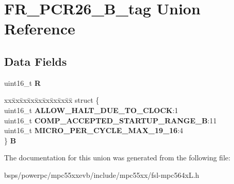 \hypertarget{unionFR__PCR26__16B__tag}{}\section{F\+R\+\_\+\+P\+C\+R26\+\_\+B\+\_\+tag Union Reference}
\label{unionFR__PCR26__16B__tag}
\subsection*{Data Fields}
\begin{DoxyCompactItemize}
\item 
\mbox{\label{unionFR__PCR26__16B__tag_acda383066420ba817193115c36327430}} 
uint16\+\_\+t {\bfseries R}
\item 
\mbox{\label{unionFR__PCR26__16B__tag_a80a3d0468ddcd3802fa44b8a509f3fe8}} 
\begin{tabbing}
xx\=xx\=xx\=xx\=xx\=xx\=xx\=xx\=xx\=\kill
struct \{\\
\>uint16\_t {\bfseries ALLOW\_HALT\_DUE\_TO\_CLOCK}:1\\
\>uint16\_t {\bfseries COMP\_ACCEPTED\_STARTUP\_RANGE\_B}:11\\
\>uint16\_t {\bfseries MICRO\_PER\_CYCLE\_MAX\_19\_16}:4\\
\} {\bfseries B}\\

\end{tabbing}\end{DoxyCompactItemize}


The documentation for this union was generated from the following file\+:\begin{DoxyCompactItemize}
\item 
bsps/powerpc/mpc55xxevb/include/mpc55xx/fsl-\/mpc564x\+L.\+h\end{DoxyCompactItemize}
